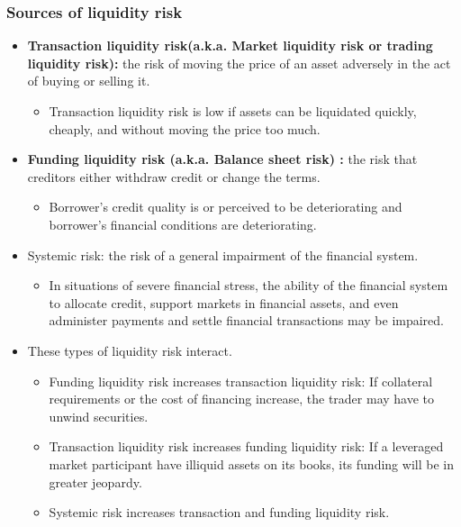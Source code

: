 \subsubsection{Sources of liquidity risk}
\begin{itemize}
\item \textbf{Transaction liquidity risk(a.k.a. Market liquidity risk or trading liquidity risk): }the risk of moving the price of an asset adversely in the act of buying or selling it.
    \begin{itemize}
    \item Transaction liquidity risk is low if assets can be liquidated quickly, cheaply, and without moving the price too much.
    \end{itemize}
\item \textbf{Funding liquidity risk (a.k.a. Balance sheet risk) :} the risk that creditors either withdraw credit or change the terms.
    \begin{itemize}
    \item Borrower's credit quality is or perceived to be deteriorating and borrower's financial conditions are deteriorating.
    \end{itemize}
\item Systemic risk: the risk of a general impairment of the financial system.
    \begin{itemize}
    \item In situations of severe financial stress, the ability of the financial system to allocate credit, support markets in financial assets, and even administer payments and settle financial transactions may be impaired.
    \end{itemize}
\item These types of liquidity risk interact.
    \begin{itemize}
    \item Funding liquidity risk increases transaction liquidity risk: If collateral requirements or the cost of financing increase, the trader may have to unwind securities.
    \item Transaction liquidity risk increases funding liquidity risk: If a leveraged market participant have illiquid assets on its books, its funding will be in greater jeopardy.
    \item Systemic risk increases transaction and funding liquidity risk.
    \end{itemize}
\end{itemize}



